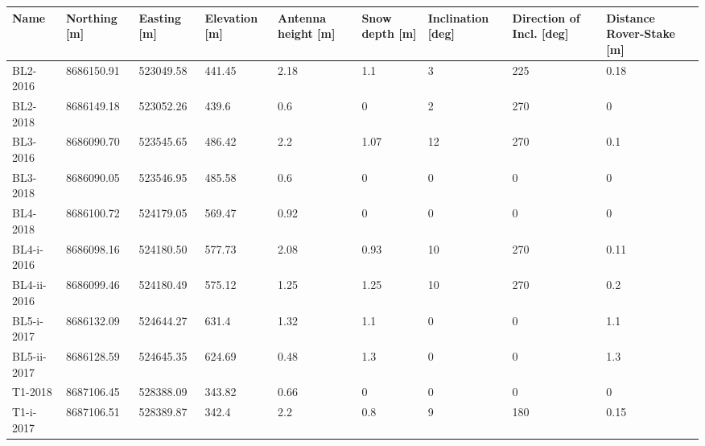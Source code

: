 \begin{tabular}{lllllllll}
\toprule
        Name & Northing [m] & Easting [m] & Elevation [m] & Antenna height [m] & Snow depth [m] & Inclination [deg] & Direction of Incl. [deg] & Distance Rover-Stake [m] \\
\midrule
    BL2-2016 &   8686150.91 &   523049.58 &        441.45 &               2.18 &            1.1 &                 3 &                      225 &                     0.18 \\
    BL2-2018 &   8686149.18 &   523052.26 &         439.6 &                0.6 &              0 &                 2 &                      270 &                        0 \\
    BL3-2016 &   8686090.70 &   523545.65 &        486.42 &                2.2 &           1.07 &                12 &                      270 &                      0.1 \\
    BL3-2018 &   8686090.05 &   523546.95 &        485.58 &                0.6 &              0 &                 0 &                        0 &                        0 \\
    BL4-2018 &   8686100.72 &   524179.05 &        569.47 &               0.92 &              0 &                 0 &                        0 &                        0 \\
  BL4-i-2016 &   8686098.16 &   524180.50 &        577.73 &               2.08 &           0.93 &                10 &                      270 &                     0.11 \\
 BL4-ii-2016 &   8686099.46 &   524180.49 &        575.12 &               1.25 &           1.25 &                10 &                      270 &                      0.2 \\
  BL5-i-2017 &   8686132.09 &   524644.27 &         631.4 &               1.32 &            1.1 &                 0 &                        0 &                      1.1 \\
 BL5-ii-2017 &   8686128.59 &   524645.35 &        624.69 &               0.48 &            1.3 &                 0 &                        0 &                      1.3 \\
     T1-2018 &   8687106.45 &   528388.09 &        343.82 &               0.66 &              0 &                 0 &                        0 &                        0 \\
   T1-i-2017 &   8687106.51 &   528389.87 &         342.4 &                2.2 &            0.8 &                 9 &                      180 &                     0.15 \\

\end{tabular}
